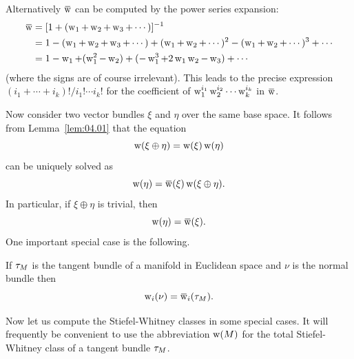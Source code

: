 \documentclass[../main]{subfiles}
\begin{document}
Alternatively $\xoverline{\sw}$ can be computed by the power series expansion:
\begin{align*}
\xoverline{\sw} &=[1+(\sw_{1}+\sw_{2}+\sw_{3}+\cdots)]^{-1} \\
&=1-(\sw_{1}+\sw_{2}+\sw_{3}+\cdots)+(\sw_{1}+\sw_{2}+\cdots)^{2}-(\sw_{1}+\sw_{2}+\cdots)^{3}+\cdots \\
&=1-\sw_{1}+(\sw_{1}^{2}-\sw_{2})+(-\sw_{1}^{3}+2\sw_{1}\sw_{2}-\sw_3)+\cdots
\end{align*}
(where the signs are of course irrelevant). This leads to the precise expression $(i_{1}+\cdots+i_{k}) ! / i_{1} ! \cdots i_{k} !$ for the coefficient of $\operatorname{w}_{1}^{i_1}\operatorname{w}_{2}^{i_{2}} \cdots \operatorname{w}_{k}^{i_k}$ in $\xoverline{\sw}$.

Now consider two vector bundles $\xi$ and $\eta$ over the same base space. It follows from Lemma~\ref{lem:04.01} that the equation
\[
\operatorname{w}(\xi \oplus \eta)=\operatorname{w}(\xi) \operatorname{w}(\eta)
\]
can be uniquely solved as
\[
\sw(\eta)=\xoverline{\sw}(\xi) \sw(\xi \oplus \eta) .
\]
In particular, if $\xi \oplus \eta$ is trivial, then
\[
\sw(\eta)=\xoverline{\sw}(\xi).
\]
One important special case is the following.

\begin{lemma}
\label{lem:04.02}
If $\tau_{M}$ is the tangent bundle
 of a manifold in Euclidean space and $\nu$ is the normal bundle then
\[
\sw_{i}(\nu)=\xoverline{\sw}_{i}(\tangentBundle{M}).
\]
\end{lemma}

Now let us compute the Stiefel-Whitney classes in some special cases. It will frequently be convenient to use the abbreviation $\operatorname{w}(M)$ for the total Stiefel\nobreakdash-Whitney class of a tangent bundle $\tau_{M}$.
\end{document}
